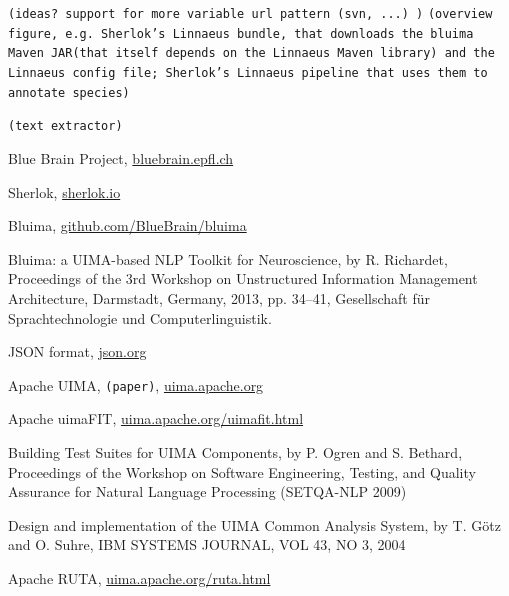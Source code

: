 \documentclass{article}
\newcommand{\JAR}{JAR\xspace}
\newcommand{\TODO}[1]{\texttt{\textcolor{YellowOrange}{(#1)}}} %
\begin{document}
\TODO{ideas? support for more variable url pattern (svn, ...) }
\TODO{overview figure, e.g.  Sherlok's Linnaeus bundle, that downloads the bluima Maven \JAR (that itself depends on the Linnaeus Maven library) and the Linnaeus config file; Sherlok's Linnaeus pipeline that uses them to annotate species}

\TODO{text extractor}


\begin{thebibliography}{99}

    Blue Brain Project,
    \href{http://bluebrain.epfl.ch/}{bluebrain.epfl.ch}

    Sherlok,
    \href{http://sherlok.io}{sherlok.io}

    Bluima,
    \href{https://github.com/BlueBrain/bluima}{github.com/BlueBrain/bluima}

    Bluima: a UIMA-based NLP Toolkit for Neuroscience,
    by R. Richardet,
    Proceedings of the 3rd Workshop on Unstructured Information Management Architecture, Darmstadt,
    Germany, 2013, pp. 34–41, Gesellschaft für Sprachtechnologie und Computerlinguistik.

    JSON format,
    \href{http://json.org/}{json.org}

    Apache UIMA,
	\TODO{paper},
    \href{https://uima.apache.org/}{uima.apache.org}

    Apache uimaFIT,
    \href{https://uima.apache.org/uimafit.html}{uima.apache.org/uimafit.html}

    Building Test Suites for UIMA Components,
    by P. Ogren and S. Bethard,
    Proceedings of the Workshop on Software Engineering, Testing, and Quality Assurance for Natural
    Language Processing (SETQA-NLP 2009)

    Design and implementation of the UIMA Common Analysis System,
    by T. Götz and O. Suhre,
    IBM SYSTEMS JOURNAL, VOL 43, NO 3, 2004

    Apache RUTA,
    \href{https://uima.apache.org/ruta.html}{uima.apache.org/ruta.html}


\end{thebibliography}
\end{document}

